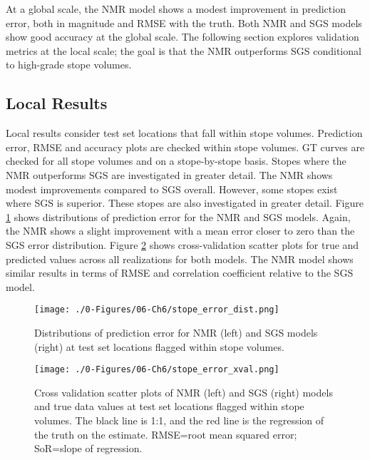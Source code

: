 At a global scale, the \gls{NMR} model shows a modest improvement in prediction error, both in magnitude and \gls{RMSE} with the truth. Both \gls{NMR} and \gls{SGS} models show good accuracy at the global scale. The following section explores validation metrics at the local scale; the goal is that the \gls{NMR} outperforms \gls{SGS} conditional to high-grade stope volumes.

\subsection{Local Results}
\label{subsec:06local}

Local results consider test set locations that fall within stope volumes. Prediction error, \gls{RMSE} and accuracy plots are checked within stope volumes. \Gls{GT} curves are checked for all stope volumes and on a stope-by-stope basis. Stopes where the \gls{NMR} outperforms \gls{SGS} are investigated in greater detail. The \gls{NMR} shows modest improvements compared to \gls{SGS} overall. However, some stopes exist where \gls{SGS} is superior. These stopes are also investigated in greater detail. Figure \ref{fig:stope_error_dist} shows distributions of prediction error for the \gls{NMR} and \gls{SGS} models. Again, the \gls{NMR} shows a slight improvement with a mean error closer to zero than the \gls{SGS} error distribution. Figure \ref{fig:stope_error_xval} shows cross-validation scatter plots for true and predicted values across all realizations for both models. The \gls{NMR} model shows similar results in terms of \gls{RMSE} and correlation coefficient relative to the \gls{SGS} model.

\begin{figure}[htb!]
    \centering
    \texttt{[image: ./0-Figures/06-Ch6/stope\_error\_dist.png]}
    \caption{Distributions of prediction error for \gls{NMR} (left) and \gls{SGS} models (right) at test set locations flagged within stope volumes. }
    \label{fig:stope_error_dist}
\end{figure}

\begin{figure}[htb!]
    \centering
    \texttt{[image: ./0-Figures/06-Ch6/stope\_error\_xval.png]}
    \caption{Cross validation scatter plots of  \gls{NMR} (left) and \gls{SGS} (right) models and true data values at test set locations flagged within stope volumes. The black line is 1:1, and the red line is the regression of the truth on the estimate. RMSE=root mean squared error; SoR=slope of regression.}
    \label{fig:stope_error_xval}
\end{figure}

